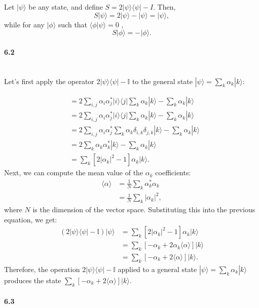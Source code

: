 Let $|\psi\rangle$ be any state, and define $S=2|\psi\rangle \langle\psi|-I$. Then,
$$S|\psi\rangle=2|\psi\rangle-|\psi\rangle=|\psi\rangle,$$
while for any $|\phi\rangle$
 such that $\langle \phi |\psi\rangle=0$
,
$$S|\phi\rangle=-|\phi\rangle.$$

\paragraph{6.2} \textbf{}
\\

Let's first apply the operator $2|\psi\rangle\langle\psi| - \mathbb{I}$ to the general state $|\psi\rangle = \sum_k \alpha_k |k\rangle$:

$$
\begin{aligned}
&= 2\sum_{i,j}\alpha_i\alpha_j^*|i\rangle\langle j|\sum_k \alpha_k |k\rangle - \sum_k \alpha_k |k\rangle \\
&= 2\sum_{i,j}\alpha_i\alpha_j^*|i\rangle\langle j|\sum_k \alpha_k |k\rangle - \sum_k \alpha_k |k\rangle \\
&= 2\sum_{i,j}\alpha_i\alpha_j^*\sum_k \alpha_k \delta_{i,k}\delta_{j,k}|k\rangle - \sum_k \alpha_k |k\rangle \\
&= 2\sum_k\alpha_k\alpha_k^*|k\rangle - \sum_k \alpha_k |k\rangle \\
&= \sum_k [2|\alpha_k|^2 - 1]\alpha_k |k\rangle.
\end{aligned}$$
Next, we can compute the mean value of the $\alpha_k$ coefficients:
$$\begin{aligned} \langle\alpha\rangle &= \frac{1}{N}\sum_k \alpha_k^* \alpha_k \\
&= \frac{1}{N}\sum_k |\alpha_k|^2,
\end{aligned}$$
where $N$ is the dimension of the vector space.
Substituting this into the previous equation, we get:
$$\begin{aligned} (2|\psi\rangle\langle\psi| - \mathbb{I})|\psi\rangle &= \sum_k [2|\alpha_k|^2 - 1]\alpha_k |k\rangle \\
&= \sum_k [-\alpha_k + 2\alpha_k\langle\alpha\rangle]|k\rangle \\
&= \sum_k [-\alpha_k + 2\langle\alpha\rangle]|k\rangle.
\end{aligned}$$
Therefore, the operation $2|\psi\rangle\langle\psi| - \mathbb{I}$ applied to a general state $|\psi\rangle = \sum_k \alpha_k |k\rangle$ produces the state $\sum_k [-\alpha_k + 2\langle\alpha\rangle]|k\rangle$.

\paragraph{6.3} \textbf{}
\\

